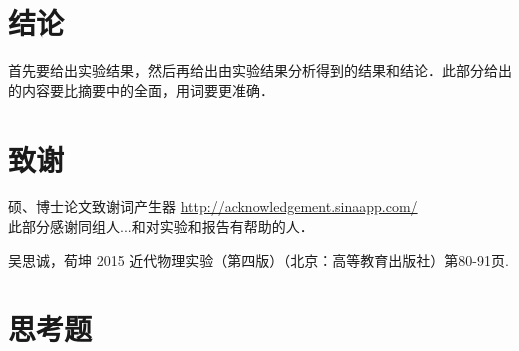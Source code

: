 \documentclass[aps,pre,12pt,preprint,onecolumn,showpacs,showkeys]{revtex4-1}
\begin{document}
\section{结论}
首先要给出实验结果，然后再给出由实验结果分析得到的结果和结论．此部分给出的内容要比摘要中的全面，用词要更准确．\par

\section{致谢}
硕、博士论文致谢词产生器 \href{http://acknowledgement.sinaapp.com/}{http://acknowledgement.sinaapp.com/}\\
此部分感谢同组人...和对实验和报告有帮助的人．
%
\begin{thebibliography}{}
 吴思诚，荀坤 2015 近代物理实验（第四版）（北京：高等教育出版社）第80-91页.

\end{thebibliography}

\clearpage
\appendix
\section{思考题}
\end{document}
